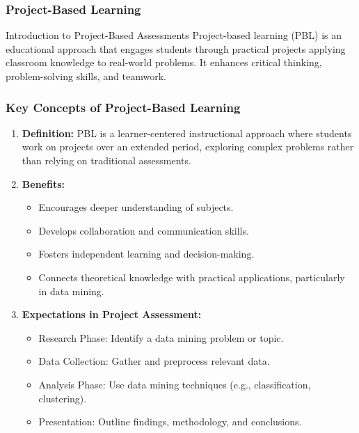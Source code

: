 \documentclass[aspectratio=169]{beamer}
\begin{document}
\begin{frame}[fragile]
    \frametitle{Project-Based Learning}
    \begin{block}{Introduction to Project-Based Assessments}
        Project-based learning (PBL) is an educational approach that engages students through practical projects applying classroom knowledge to real-world problems. It enhances critical thinking, problem-solving skills, and teamwork.
    \end{block}
\end{frame}

\begin{frame}[fragile]
    \frametitle{Key Concepts of Project-Based Learning}
    \begin{enumerate}
        \item \textbf{Definition:} 
        PBL is a learner-centered instructional approach where students work on projects over an extended period, exploring complex problems rather than relying on traditional assessments.
        
        \item \textbf{Benefits:}
        \begin{itemize}
            \item Encourages deeper understanding of subjects.
            \item Develops collaboration and communication skills.
            \item Fosters independent learning and decision-making.
            \item Connects theoretical knowledge with practical applications, particularly in data mining.
        \end{itemize}
        
        \item \textbf{Expectations in Project Assessment:}
        \begin{itemize}
            \item Research Phase: Identify a data mining problem or topic.
            \item Data Collection: Gather and preprocess relevant data.
            \item Analysis Phase: Use data mining techniques (e.g., classification, clustering).
            \item Presentation: Outline findings, methodology, and conclusions.
        \end{itemize}
    \end{enumerate}
\end{frame}
\end{document}
